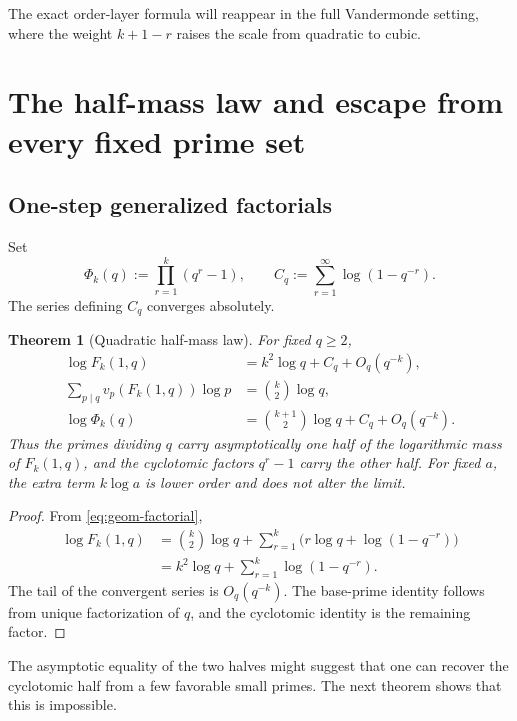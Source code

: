 \documentclass[11pt]{article}
\newtheorem{theorem}{Theorem}[section]
\theoremstyle{definition}
\theoremstyle{remark}
\begin{document}
The exact order-layer formula will reappear in the full Vandermonde setting,
where the weight $k+1-r$ raises the scale from quadratic to cubic.

\section{The half-mass law and escape from every fixed prime set}

\subsection{One-step generalized factorials}

Set
\[
 \Phi_k(q):=\prod_{r=1}^k(q^r-1),
 \qquad
 C_q:=\sum_{r=1}^{\infty}\log(1-q^{-r}).
\]
The series defining $C_q$ converges absolutely.

\begin{theorem}[Quadratic half-mass law]\label{thm:half-mass-factorial}
For fixed $q\geq2$,
\begin{align}
 \log F_k(1,q)
   &=k^2\log q+C_q+O_q(q^{-k}),\label{eq:total-factorial-mass}\\
 \sum_{p\mid q}v_p(F_k(1,q))\log p
   &=\binom{k}{2}\log q,\label{eq:base-factorial-mass}\\
 \log\Phi_k(q)
   &=\binom{k+1}{2}\log q+C_q+O_q(q^{-k}).\label{eq:cyc-factorial-mass}
\end{align}
Thus the primes dividing $q$ carry asymptotically one half of the logarithmic
mass of $F_k(1,q)$, and the cyclotomic factors $q^r-1$ carry the other half.
For fixed $a$, the extra term $k\log a$ is lower order and does not alter the
limit.
\end{theorem}

\begin{proof}
From \eqref{eq:geom-factorial},
\begin{align*}
 \log F_k(1,q)
 &=\binom{k}{2}\log q+
   \sum_{r=1}^k\bigl(r\log q+\log(1-q^{-r})\bigr)\\
 &=k^2\log q+\sum_{r=1}^k\log(1-q^{-r}).
\end{align*}
The tail of the convergent series is $O_q(q^{-k})$.  The base-prime identity
follows from unique factorization of $q$, and the cyclotomic identity is the
remaining factor.
\end{proof}

The asymptotic equality of the two halves might suggest that one can recover
the cyclotomic half from a few favorable small primes.  The next theorem
shows that this is impossible.
\end{document}
